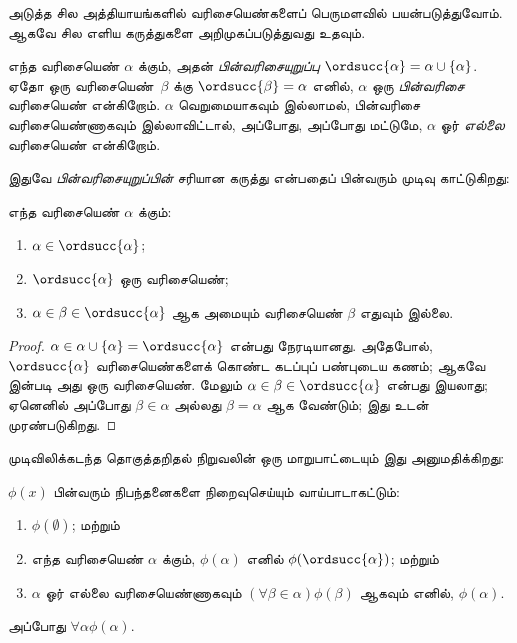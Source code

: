 \documentclass[../../../include/open-logic-section]{subfiles}
\begin{document}

அடுத்த சில அத்தியாயங்களில் வரிசையெண்களைப் பெருமளவில் பயன்படுத்துவோம்.
ஆகவே சில எளிய கருத்துகளை அறிமுகப்படுத்துவது உதவும்.

\begin{defn}
எந்த வரிசையெண் $\alpha$ க்கும், அதன் \emph{பின்வரிசையுறுப்பு}
$\ordsucc{\alpha} =\alpha \cup \{\alpha\}$. ஏதோ ஒரு வரிசையெண்~$\beta$
க்கு $\ordsucc{\beta} = \alpha$ எனில், $\alpha$ ஒரு
\emph{பின்வரிசை} வரிசையெண் என்கிறோம். $\alpha$ வெறுமையாகவும் இல்லாமல்,
பின்வரிசை வரிசையெண்ணாகவும் இல்லாவிட்டால், அப்போது, அப்போது மட்டுமே,
$\alpha$ ஓர் \emph{எல்லை} வரிசையெண் என்கிறோம்.
\end{defn}
\noindent
இதுவே \emph{பின்வரிசையுறுப்பின்} சரியான கருத்து என்பதைப் பின்வரும் முடிவு
காட்டுகிறது:

\begin{prop}
எந்த வரிசையெண் $\alpha$ க்கும்:
\begin{enumerate}
	\item $\alpha \in \ordsucc{\alpha}$;
	\item $\ordsucc{\alpha}$ ஒரு வரிசையெண்;
	\item $\alpha \in \beta \in \ordsucc{\alpha}$ ஆக அமையும் வரிசையெண்
	$\beta$ எதுவும் இல்லை.
	\end{enumerate}
\end{prop}

\begin{proof}
$\alpha \in \alpha \cup \{\alpha\} = \ordsucc{\alpha}$ என்பது
நேரடியானது. அதேபோல், $\ordsucc{\alpha}$ வரிசையெண்களைக் கொண்ட கடப்புப்
பண்புடைய கணம்; ஆகவே  இன்படி அது ஒரு
வரிசையெண். மேலும் $\alpha \in \beta \in \ordsucc{\alpha}$ என்பது
இயலாது; ஏனெனில் அப்போது $\beta \in \alpha$ அல்லது
$\beta = \alpha$ ஆக வேண்டும்; இது  உடன்
முரண்படுகிறது.
\end{proof}
\noindent
முடிவிலிக்கடந்த தொகுத்தறிதல் நிறுவலின் ஒரு மாறுபாட்டையும் இது அனுமதிக்கிறது:

\begin{thm}[எளிய முடிவிலிக்கடந்த தொகுத்தறிதல்]
$\phi(x)$ பின்வரும் நிபந்தனைகளை நிறைவுசெய்யும் வாய்பாடாகட்டும்:
\begin{enumerate}
	\item $\phi(\emptyset)$; மற்றும்
	\item எந்த வரிசையெண் $\alpha$ க்கும், $\phi(\alpha)$ எனில்
	$\phi(\ordsucc{\alpha})$; மற்றும்
	\item $\alpha$ ஓர் எல்லை வரிசையெண்ணாகவும் $(\forall \beta \in
	\alpha)\phi(\beta)$ ஆகவும் எனில், $\phi(\alpha)$.
\end{enumerate}
அப்போது $\forall \alpha \phi(\alpha)$.
\end{thm}
\end{document}
